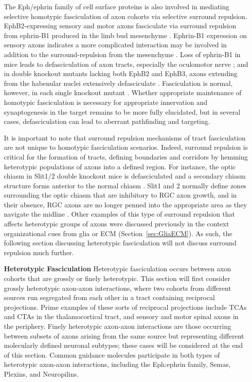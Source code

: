 The Eph/ephrin family of cell surface proteins is also involved in mediating selective homotypic fasciculation of axon cohorts via selective surround repulsion.
EphB2-expressing sensory and motor axons fasciculate via surround repulsion from ephrin-B1 produced in the limb bud mesenchyme \cite{luxey2013eph}.
Ephrin-B1 expression on sensory axons indicates a more complicated interaction may be involved in addition to the surround-repulsion from the mesenchyme \cite{luxey2013eph}.
Loss of ephrin-B1 in mice leads to defasciculation of axon tracts, especially the oculomotor nerve \cite{davy2004ephrin}; and in double knockout mutants lacking both EphB2 and EphB3, axons extending from the habenular nuclei extensively defasciculate \cite{orioli1996sek4}.
Fasciculation is normal, however, in each single knockout mutant \cite{orioli1996sek4}.
Whether appropriate maintenance of homotypic fasciculation is necessary for appropriate innervation and synaptogenesis in the target remains to be more fully elucidated, but in several cases, defasciculation can lead to aberrant pathfinding and targeting.

It is important to note that surround repulsion mechanisms of tract fasciculation are not unique to homotypic fasciculation scenarios.
Indeed, surround repulsion is critical for the formation of tracts, defining boundaries and corridors by hemming heterotypic populations of axons into a defined region.
For instance, the optic chiasm in Slit1/2 double knockout mice is defasciculated and a secondary chiasm structure forms anterior to the normal chiasm \cite{plump2002slit1}.
Slit1 and 2 normally define zones surrounding the optic chiasm that are inhibitory to RGC axon growth, and in their absence, RGC axons are no longer penned into the appropriate area as they navigate the midline \cite{plump2002slit1}.
Other examples of this type of surround repulsion that affects heterotypic groups of axons were discussed previously in the context organizational cues from glia or ECM (Section~\ref{sec:GliaECM}).
As such, the following section discussing heterotypic fasciculation will not discuss surround repulsion much further.

\noindent\textbf{Heterotypic Fasciculation}\newline
\indent Heterotypic fasciculation occurs between axon cohorts that are grossly or finely heterotypic.
This section will first consider grossly heterotypic axon-axon interactions, where two cohorts from different sources run segregated from each other in a tract containing reciprocal projections.
Prime examples of these sorts of reciprocal projections include TCAs and CTAs in the thalamocortical tract, and sensory and motor spinal axons in the periphery.
Finely heterotypic axon-axon interactions are those occurring between subsets of axons arising from the same source but representing different molecularly defined neuronal subtypes; these cases will be considered at the end of this section.
Common guidance molecules participate in both types of heterotypic axon-axon interactions, including the Eph:ephrin family, Semas, Plexins, and Neuropilins.

